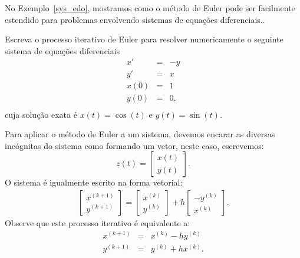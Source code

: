 No Exemplo~\ref{sys_edo}, mostramos como o método de Euler pode ser facilmente estendido para problemas envolvendo sistemas de equações diferenciais..
\begin{ex}\label{sys_edo} Escreva o processo iterativo de Euler para resolver numericamente o seguinte sistema de equações diferenciais
\begin{eqnarray*}
x'&=&-y\\
y'&=&x\\
x(0)&=&1\\
y(0)&=&0,\\
\end{eqnarray*}
cuja solução exata é $x(t)=\cos(t)$ e $y(t)=\sin(t)$.
\end{ex}
Para aplicar o método de Euler a um sistema, devemos encarar as diversas incógnitas do sistema como formando um vetor, neste caso, escrevemos:
 $$z(t)=\left[\begin{array}{c}x(t)\\y(t)\end{array}\right].$$
 O sistema é igualmente escrito na forma vetorial:
\begin{eqnarray*}
\left[\begin{array}{c}x^{(k+1)}\\y^{(k+1)}\end{array}\right]=\left[\begin{array}{c}x^{(k)}\\y^{(k)}\end{array}\right]+h\left[\begin{array}{c}-y^{(k)}\\x^{(k)}\end{array}\right].
\end{eqnarray*}
Observe que este processo iterativo é equivalente a:
\begin{eqnarray*}
x^{(k+1)}&=&x^{(k)}-hy^{(k)}\\
y^{(k+1)}&=&y^{(k)}+hx^{(k)}.
\end{eqnarray*}


